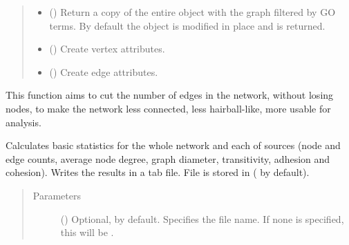\documentclass[letterpaper,10pt,english]{sphinxmanual}
\begin{document}
\begin{fulllineitems}
\begin{fulllineitems}
\begin{quote}
\begin{description}
\begin{itemize}
\item {} 
 () \textendash{} Return a copy of the entire  object with the graph
filtered by GO terms. By default the object is modified in place
and  is returned.

\item {} 
 () \textendash{} Create vertex attributes.

\item {} 
 () \textendash{} Create edge attributes.

\end{itemize}

\end{description}\end{quote}

\end{fulllineitems}


\begin{fulllineitems}
\label{\detokenize{reference:pypath.main.PyPath.network_filter}}
This function aims to cut the number of edges in the network,
without losing nodes, to make the network less connected,
less hairball-like, more usable for analysis.

\end{fulllineitems}


\begin{fulllineitems}
\label{\detokenize{reference:pypath.main.PyPath.network_stats}}
Calculates basic statistics for the whole network and each of
sources (node and edge counts, average node degree, graph
diameter, transitivity, adhesion and cohesion). Writes the
results in a tab file. File is stored in
 ( by default).
\begin{quote}\begin{description}
\item[{Parameters}] \leavevmode
{} () \textendash{} Optional,  by default. Specifies the file name. If
none is specified, this will be
.


\end{description}
\end{quote}
\end{fulllineitems}
\end{fulllineitems}
\end{document}
